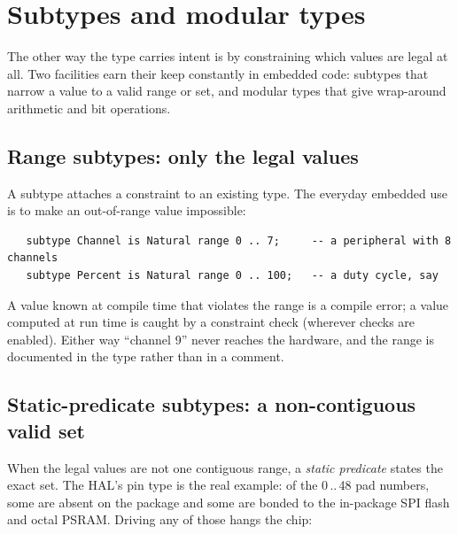 
\section{Subtypes and modular types}
\label{sec:subtypes}

The other way the type carries intent is by constraining which values are legal
at all. Two facilities earn their keep constantly in embedded code: subtypes that
narrow a value to a valid range or set, and modular types that give wrap-around
arithmetic and bit operations.

\subsection{Range subtypes: only the legal values}

A subtype attaches a constraint to an existing type. The everyday embedded use is
to make an out-of-range value impossible:

\begin{lstlisting}
   subtype Channel is Natural range 0 .. 7;     -- a peripheral with 8 channels
   subtype Percent is Natural range 0 .. 100;   -- a duty cycle, say
\end{lstlisting}

A value known at compile time that violates the range is a compile error; a value
computed at run time is caught by a constraint check (wherever checks are
enabled). Either way ``channel 9'' never reaches the hardware, and the range is
documented in the type rather than in a comment.

\subsection{Static-predicate subtypes: a non-contiguous valid set}

When the legal values are not one contiguous range, a \emph{static predicate}
states the exact set. The HAL's pin type is the real example: of the 0\,..\,48 pad
numbers, some are absent on the package and some are bonded to the in-package SPI
flash and octal PSRAM. Driving any of those hangs the chip:

